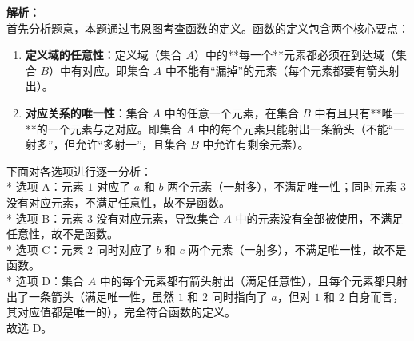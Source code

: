 \documentclass[12pt,a4paper]{exam-zh}
\makeatletter
\newcounter{answerkeyquestion}
\let\originalparen\paren
\newcommand{\answerkeyitems}{}
\newcommand{\addanswerkeyitem}[2]{%
  \pgfmathtruncatemacro{\row}{ifthenelse(#1<=\cols,0,1)}%
  \pgfmathtruncatemacro{\col}{mod(#1-1,\cols)}%
  \pgfmathsetlengthmacro{\x}{\col*\boxw}%
  \pgfmathsetlengthmacro{\y}{-\row*\boxh}%
  \draw (\x,\y) rectangle ++(\boxw,\boxh);%
  \node[anchor=north west] at (\x+\offset,\y+\boxh-\offset) {\textbf{#1.}};%
  \node at (\x+0.6*\boxw,\y+0.45*\boxh) {\Large\textbf{#2}};%
}
\renewcommand{\paren}[1][]{%
  \originalparen[#1]%
  \edef\answerkeytemp{#1}%
  \ifx\answerkeytemp\@empty\else
    \stepcounter{answerkeyquestion}%
    \begingroup
      \edef\x{\endgroup
        \noexpand\g@addto@macro\noexpand\answerkeyitems{\noexpand\addanswerkeyitem{\theanswerkeyquestion}{#1}}}%
    \x
  \fi
}
\makeatother
\begin{document}
\begin{solution}
    \textbf{解析：} \\
    首先分析题意，本题通过韦恩图考查函数的定义。函数的定义包含两个核心要点：
    \begin{enumerate}
        \item \textbf{定义域的任意性}：定义域（集合 $A$）中的**每一个**元素都必须在到达域（集合 $B$）中有对应。即集合 $A$ 中不能有“漏掉”的元素（每个元素都要有箭头射出）。
        \item \textbf{对应关系的唯一性}：集合 $A$ 中的任意一个元素，在集合 $B$ 中有且只有**唯一**的一个元素与之对应。即集合 $A$ 中的每个元素只能射出一条箭头（不能“一射多”，但允许“多射一”，且集合 $B$ 中允许有剩余元素）。
    \end{enumerate}
    
    下面对各选项进行逐一分析： \\
    * 选项 A：元素 $1$ 对应了 $a$ 和 $b$ 两个元素（一射多），不满足唯一性；同时元素 $3$ 没有对应元素，不满足任意性，故不是函数。 \\
    * 选项 B：元素 $3$ 没有对应元素，导致集合 $A$ 中的元素没有全部被使用，不满足任意性，故不是函数。 \\
    * 选项 C：元素 $2$ 同时对应了 $b$ 和 $c$ 两个元素（一射多），不满足唯一性，故不是函数。 \\
    * 选项 D：集合 $A$ 中的每个元素都有箭头射出（满足任意性），且每个元素都只射出了一条箭头（满足唯一性，虽然 $1$ 和 $2$ 同时指向了 $a$，但对 $1$ 和 $2$ 自身而言，其对应值都是唯一的），完全符合函数的定义。 \\
    故选 D。
\end{solution}


\end{document}
